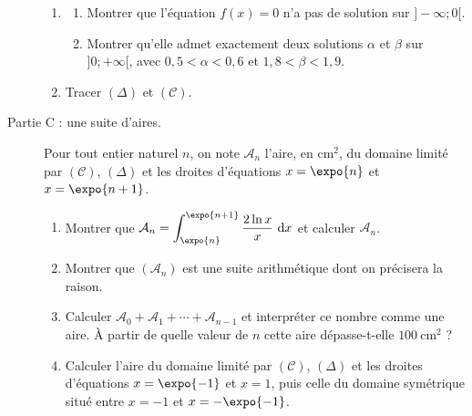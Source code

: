 \begin{exo}
\begin{description}
\begin{enumerate}
                        \item \begin{enumerate}
                                    \item Montrer que l'\'equation $f(x) = 0$ n'a pas de solution sur $]-\infty ; 0[$.
                                    \item Montrer qu'elle admet exactement deux solutions $\alpha$ et $\beta$ sur $]0 ; +\infty[$, avec
                                          $0{,}5 < \alpha < 0{,}6$ et $1{,}8 < \beta < 1{,}9$.
                              \end{enumerate}
                        \item Tracer $(\Delta)$ et $(\mathscr{C})$.
                  \end{enumerate}
            \item[Partie C : une suite d'aires.]
                  Pour tout entier naturel $n$, on note $\mathcal{A}_n$ l'aire, en $\text{cm}^2$, du domaine limit\'e par $(\mathscr{C})$,
                  $(\Delta)$ et les droites d'\'equations $x = \expo{n}$ et $x = \expo{n+1}$.
                  \begin{enumerate}
                        \item Montrer que $\mathcal{A}_n = \displaystyle \int_{\expo{n}}^{\expo{n+1}} \frac{2\ln x}{x} \dx$ et calculer $\mathcal{A}_n$.
                        \item Montrer que $(\mathcal{A}_n)$ est une suite arithm\'etique dont on pr\'ecisera la raison.
                        \item Calculer $\mathcal{A}_0 + \mathcal{A}_1 + \cdots + \mathcal{A}_{n-1}$ et interpr\'eter ce nombre comme une aire.
                              \`A partir de quelle valeur de $n$ cette aire d\'epasse-t-elle $100~\text{cm}^2$ ?
                        \item Calculer l'aire du domaine limit\'e par $(\mathscr{C})$, $(\Delta)$ et les droites d'\'equations
                              $x = \expo{-1}$ et $x = 1$, puis celle du domaine sym\'etrique situ\'e entre $x = -1$ et $x = -\expo{-1}$.
                  \end{enumerate}
      \end{description}
\end{exo}
